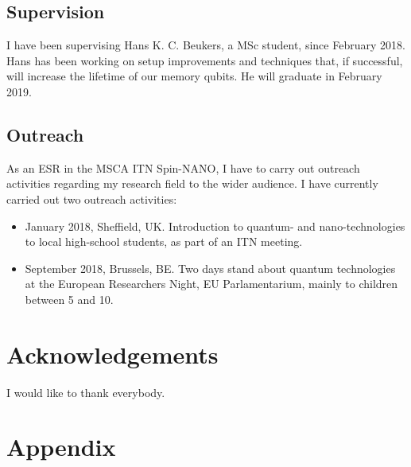 \documentclass[a4paper, twoside]{article}
\begin{document}
\subsection{Supervision}
I have been supervising Hans K. C. Beukers, a MSc student, since February 2018. Hans has been working on setup improvements and techniques that, if successful, will increase the lifetime of our memory qubits. He will graduate in February 2019.

\subsection{Outreach}
As an \ac{ESR} in the \ac{MSCA} \ac{ITN} Spin-NANO, I have to carry out outreach activities regarding my research field to the wider audience. I have currently carried out two outreach activities:
\begin{itemize}
	\item January 2018, Sheffield, UK. Introduction to quantum- and nano-technologies to local high-school students, as part of an \ac{ITN} meeting. 
	\item September 2018, Brussels, BE. Two days stand about quantum technologies at the European Researchers Night, EU Parlamentarium, mainly to children between 5 and 10. 
\end{itemize}

\section*{Acknowledgements}
I would like to thank everybody.

\section*{Appendix}
\renewcommand{\thefigure}{A\arabic{figure}}
\setcounter{figure}{0}
\end{document}
